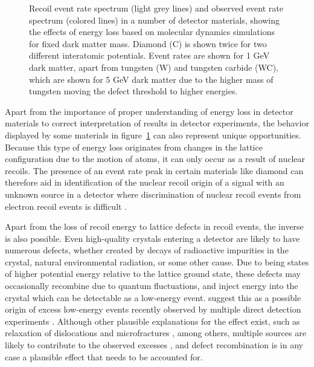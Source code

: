 \documentclass[b5paper, 10pt, twoside]{book}
\newcommand{\wcolor}{scp-brown-dark-1}
\begin{document}
\begin{figure}
    \caption{Recoil event rate spectrum (light grey lines) and observed event rate spectrum (colored lines) in a number of detector materials, showing the effects of energy loss based on molecular dynamics simulations for fixed dark matter mass. Diamond (C) is shown twice for two different interatomic potentials. Event rates are shown for 1 GeV dark matter, apart from tungsten (W) and tungsten carbide (WC), which are shown for 5 GeV dark matter due to the higher mass of tungsten moving the defect threshold to higher energies.}
    \label{fig:event-rate-eloss}
\end{figure}

Apart from the importance of proper understanding of energy loss in detector materials to correct interpretation of results in detector experiments, the behavior displayed by some materials in figure~\ref{fig:event-rate-eloss} can also represent unique opportunities. Because this type of energy loss originates from changes in the lattice configuration due to the motion of atoms, it can only occur as a result of nuclear recoils. The presence of an event rate peak in certain materials like diamond can therefore aid in identification of the nuclear recoil origin of a signal with an unknown source in a detector where discrimination of nuclear recoil events from electron recoil events is difficult \parencite{HeikinheimoEtAl2022}.

Apart from the loss of recoil energy to lattice defects in recoil events, the inverse is also possible. Even high-quality crystals entering a detector are likely to have numerous defects, whether created by decays of radioactive impurities in the crystal, natural environmental radiation, or some other cause. Due to being states of higher potential energy relative to the lattice ground state, these defects may occasionally recombine due to quantum fluctuations, and inject energy into the crystal which can be detectable as a low-energy event. \textcite{NordlundEtAl2024} suggest this as a possible origin of excess low-energy events recently observed by multiple direct detection experiments \parencites{CRESSTIII2019, DAMIC2020, EDELWEISS2020, NUCLEUS2020, SENSEI2020, SuperCDMS2020}. Although other plausible explanations for the effect exist, such as relaxation of dislocations and microfractures \parencites{AnthonyPetersen2024, Romani2024}, among others, multiple sources are likely to contribute to the observed excesses \parencite{AdariEtAl2022}, and defect recombination is in any case a plausible effect that needs to be accounted for.
\end{document}
